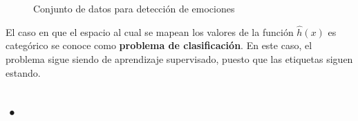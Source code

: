 \begin{figure}[h]
\centering
\caption{Conjunto de datos para detección de emociones}
\label{fig:emotion detection dataset classification}
\end{figure}

El caso en que el espacio al cual se mapean los valores de la función $\hat{h}(x)$ es categórico se conoce como \textbf{problema de clasificación}. En este caso, el problema sigue siendo de aprendizaje supervisado, puesto que las etiquetas siguen estando. 

\subsection{•}




